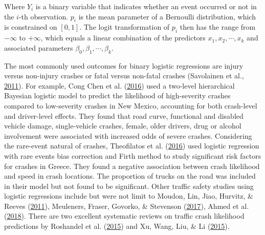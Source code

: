 \documentclass[12pt]{book}
\numberwithin{equation}{chapter}
\begin{document}
Where \(Y_i\) is a binary variable that indicates whether an event occurred or not in the \(i\)-th observation. \(p_i\) is the mean parameter of a Bernoulli distribution, which is constrained on \([0, 1]\). The logit transformation of \(p_i\) then has the range from \(-\infty\) to \(+\infty\), which equals a linear combination of the predictors \(x_1, x_2, \cdots, x_k\) and associated parameters \(\beta_0, \beta_1, \cdots, \beta_k\).

The most commonly used outcomes for binary logistic regressions are injury versus non-injury crashes or fatal versus non-fatal crashes (Savolainen et al., \protect\hyperlink{ref-savolainen2011statistical}{2011}). For example, Cong Chen et al. (\protect\hyperlink{ref-chen2016driver}{2016}) used a two-level hierarchical Bayesian logistic model to predict the likelihood of high-severity crashes compared to low-severity crashes in New Mexico, accounting for both crash-level and driver-level effects. They found that road curve, functional and disabled vehicle damage, single-vehicle crashes, female, older drivers, drug or alcohol involvement were associated with increased odds of severe crashes. Considering the rare-event natural of crashes, Theofilatos et al. (\protect\hyperlink{ref-theofilatos2016predicting}{2016}) used logistic regression with rare events bias correction and Firth method to study significant risk factors for crashes in Greece. They found a negative association between crash likelihood and speed in crash locations. The proportion of trucks on the road was included in their model but not found to be significant. Other traffic safety studies using logistic regressions include but were not limit to Moudon, Lin, Jiao, Hurvitz, \& Reeves (\protect\hyperlink{ref-moudon2011risk}{2011}), Meuleners, Fraser, Govorko, \& Stevenson (\protect\hyperlink{ref-meuleners2017determinants}{2017}), Ahmed et al. (\protect\hyperlink{ref-ahmed2018effects}{2018}). There are two excellent systematic reviews on traffic crash likelihood predictions by Roshandel et al. (\protect\hyperlink{ref-roshandel2015impact}{2015}) and Xu, Wang, Liu, \& Li (\protect\hyperlink{ref-xu2015calibration}{2015}).
\end{document}
